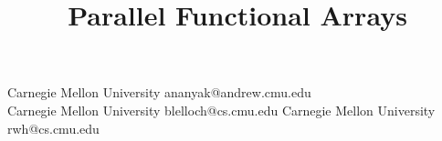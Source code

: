 \documentclass[preprint]{sigplanconf}
\begin{document}
\setlength{\pdfpageheight}{\paperheight}
\setlength{\pdfpagewidth}{\paperwidth}




\title{Parallel Functional Arrays}

           {Carnegie Mellon University}
           {ananyak@andrew.cmu.edu\\[-5.0ex]}
           {Carnegie Mellon University}
           {blelloch@cs.cmu.edu}
           {Carnegie Mellon University}
           {rwh@cs.cmu.edu}
\maketitle

\newtheorem{theorem}{Theorem}[section]
\newtheorem{corollary}{Corollary}[theorem]
\newtheorem{lemma}[theorem]{Lemma}
\theoremstyle{definition}
\newtheorem{definition}{Definition}[section]
\end{document}
